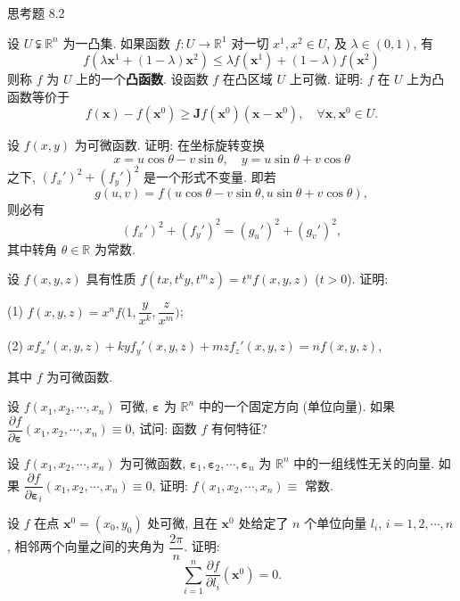 \begin{exblock}{思考题 8.2}
  \item 设 $U \subsetneqq \mathbb{R}^{n}$ 为一凸集. 如果函数 $f: U \to \mathbb{R}^{1}$ 对一切 $x^{1}, x^{2} \in U$, 及 $\lambda \in (0, 1)$, 有
  \[
    f(\lambda\boldsymbol{x}^{1} + (1 - \lambda)\boldsymbol{x}^{2}) \leqslant \lambda f(\boldsymbol{x}^{1}) + (1 - \lambda)f(\boldsymbol{x}^{2})
  \]
  则称 $f$ 为 $U$ 上的一个\textbf{凸函数}. 设函数 $f$ 在凸区域 $U$ 上可微. 证明: $f$ 在 $U$ 上为凸函数等价于
  \[
    f(\boldsymbol{x}) - f(\boldsymbol{x}^{0}) \geqslant \boldsymbol{J}f(\boldsymbol{x}^{0})(\boldsymbol{x} - \boldsymbol{x}^{0}), \quad \forall\boldsymbol{x}, \boldsymbol{x}^{0} \in U.
  \]

  \item 设 $f(x, y)$ 为可微函数. 证明: 在坐标旋转变换
  \[
    x = u\cos\theta - v\sin\theta, \quad y = u\sin\theta + v\cos\theta
  \]
  之下, $(f_{x}')^{2} + (f_{y}')^{2}$ 是一个形式不变量. 即若
  \[
    g(u, v) = f(u\cos\theta - v\sin\theta, u\sin\theta + v\cos\theta),
  \]
  则必有
  \[
    (f_{x}')^{2} + (f_{y}')^{2} = (g_{u}')^{2} + (g_{v}')^{2},
  \]
  其中转角 $\theta \in \mathbb{R}$ 为常数.

  \item 设 $f(x, y, z)$ 具有性质 $f(tx, t^{k}y, t^{m}z) = t^{n}f(x, y, z)$ ($t > 0$). 证明:

  (1) $f(x, y, z) = x^{n}f\Big(1, \dfrac{y}{x^{k}}, \dfrac{z}{x^{m}}\Big)$;

  (2) $xf_{x}'(x, y, z) + kyf_{y}'(x, y, z) + mzf_{z}'(x, y, z) = nf(x, y, z)$,

  其中 $f$ 为可微函数.

  \item 设 $f(x_{1}, x_{2}, \cdots, x_{n})$ 可微, $\boldsymbol{\varepsilon}$ 为 $\mathbb{R}^{n}$ 中的一个固定方向 (单位向量). 如果 $\dfrac{\partial f}{\partial \boldsymbol{\varepsilon}}(x_{1}, x_{2}, \cdots, x_{n}) \equiv 0$, 试问: 函数 $f$ 有何特征?

  \item 设 $f(x_{1}, x_{2}, \cdots, x_{n})$ 为可微函数, $\boldsymbol{\varepsilon}_{1}, \boldsymbol{\varepsilon}_{2}, \cdots, \boldsymbol{\varepsilon}_{n}$ 为 $\mathbb{R}^{n}$ 中的一组线性无关的向量. 如果 $\dfrac{\partial f}{\partial \boldsymbol{\varepsilon}_{i}}(x_{1}, x_{2}, \cdots, x_{n}) \equiv 0$, 证明: $f(x_{1}, x_{2}, \cdots, x_{n}) \equiv$ 常数.

  \item 设 $f$ 在点 $\boldsymbol{x}^{0} = (x_{0}, y_{0})$ 处可微, 且在 $\boldsymbol{x}^{0}$ 处给定了 $n$ 个单位向量 $l_{i}$, $i = 1, 2, \cdots, n$, 相邻两个向量之间的夹角为 $\dfrac{2\pi}{n}$. 证明:
  \[
    \sum_{i=1}^{n}\frac{\partial f}{\partial l_{i}}(\boldsymbol{x}^{0}) = 0.
  \]


\end{exblock}
